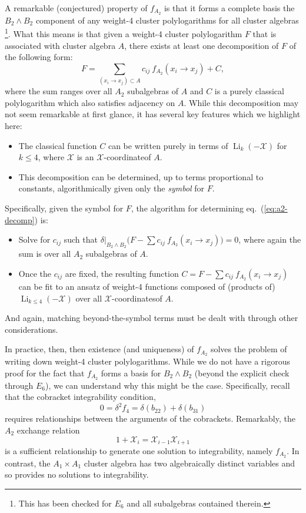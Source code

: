 \documentclass[11pt]{article}
\DeclareMathOperator{\Li}{Li}
\def\x{\mathcal{X}}
\def\xcoord{$\mathcal{X}$-coordinate}
\def\xcoords{$\mathcal{X}$-coordinates}
\begin{document}
A remarkable (conjectured) property of $f_{A_2}$ is that it forms a complete basis the $B_2 \wedge B_2$ component of any weight-4 cluster polylogarithms for all cluster algebras \footnote{This has been checked for $E_6$ and all subalgebras contained therein.}. What this means is that given a weight-4 cluster polylogarithm $F$ that is associated with cluster algebra $A$, there exists at least one decomposition of $F$ of the following form:
\begin{equation}\label{eq:a2-decomp}
	F = \sum_{(x_i\to x_j) \subset A} c_{ij} ~f_{A_2}(x_i \to x_j) + C, 
\end{equation}
where the sum ranges over all $A_2$ subalgebras of $A$ and $C$ is a purely classical polylogarithm which also satisfies adjacency on $A$. While this decomposition may not seem remarkable at first glance, it has several key features which we highlight here:
\begin{itemize}
	\item The classical function $C$ can be written purely in terms of $\Li_{k}(-\x)$ for $k\le4$, where $\x$ is an \xcoord of $A$.
	\item This decomposition can be determined, up to terms proportional to constants, algorithmically given only the \emph{symbol} for $F$.
\end{itemize}
Specifically, given the symbol for $F$, the algorithm for determining eq.~(\ref{eq:a2-decomp}) is: 
\begin{itemize}
	\item Solve for $c_{ij}$ such that $\delta|_{B_2 \wedge B_2}\big(F - \sum c_{ij} ~f_{A_2}(x_i \to x_j)\big) = 0$, where again the sum is over all $A_2$ subalgebras of $A$.
	\item Once the $c_{ij}$ are fixed, the resulting function $C = F - \sum c_{ij} ~f_{A_2}(x_i \to x_j)$ can be fit to an ansatz of weight-4 functions composed of (products of) $\Li_{k\le4}(-\x)$ over all \xcoords of $A$. 
\end{itemize}
And again, matching beyond-the-symbol terms must be dealt with through other considerations. 

In practice, then, then existence (and uniqueness) of $f_{A_2}$ solves the problem of writing down weight-4 cluster polylogarithms. While we do not have a rigorous proof for the fact that $f_{A_2}$ forms a basis for $B_2 \wedge B_2$ (beyond the explicit check through $E_6$), we can understand why this might be the case. Specifically, recall that the cobracket integrability condition,
\begin{equation} \label{eq:integrability}
	0 = \delta^2 f_4 = \delta(b_{22}) + \delta(b_{31})
\end{equation}
requires relationships between the arguments of the cobrackets. Remarkably, the $A_2$ exchange relation
\begin{equation}
	1+\x_i = \x_{i-1}\x_{i+1}
\end{equation}
is a sufficient relationship to generate one solution to integrability, namely $f_{A_2}$. In contrast, the $A_1\times A_1$ cluster algebra has two algebraically distinct variables and so provides no solutions to integrability. 
\end{document}
